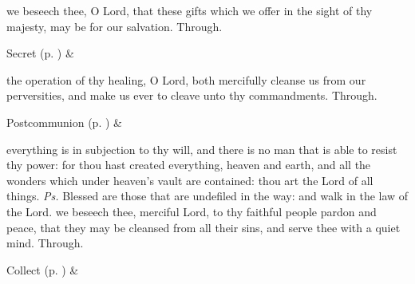
\secret
{} we beseech thee, O Lord, that these gifts which we offer in the sight of thy majesty, may be for our salvation. Through.


\begin{rubric}
     Secret  (p. \pageref{SPSaints}) \&  
\end{rubric}

\postcommunion
{} the operation of thy healing, O Lord, both mercifully cleanse us from our perversities, and make us ever to cleave unto thy commandments. Through.
\begin{rubric}
     Postcommunion  (p. \pageref{SPSaints}) \&  
\end{rubric}


\clearpage
{}\label{trinity}


\introit
{} everything is in subjection to thy will, and there is no man that is able to resist thy power: for thou hast created everything, heaven and earth, and all the wonders which under heaven's vault are contained: thou art the Lord of all things. \textit{Ps.} Blessed are those that are undefiled in the way: and walk in the law of the Lord.
\collect
{} we beseech thee, merciful Lord, to thy faithful people pardon and peace, that they may be cleansed from all their sins, and serve thee with a quiet mind. Through.
\begin{rubric}
     Collect  (p. \pageref{SPSaints}) \&  
\end{rubric}

